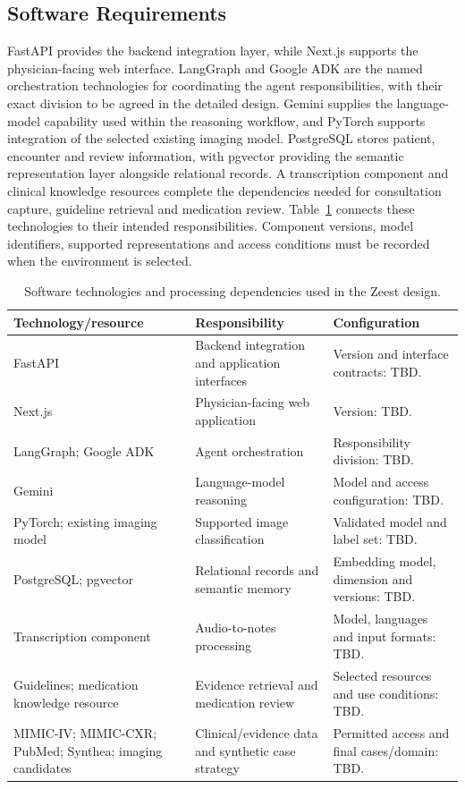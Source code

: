 \clearpage
\subsection{Software Requirements}
FastAPI provides the backend integration layer, while Next.js supports the physician-facing web interface. LangGraph and Google ADK are the named orchestration technologies for coordinating the agent responsibilities, with their exact division to be agreed in the detailed design. Gemini supplies the language-model capability used within the reasoning workflow, and PyTorch supports integration of the selected existing imaging model. PostgreSQL stores patient, encounter and review information, with pgvector providing the semantic representation layer alongside relational records. A transcription component and clinical knowledge resources complete the dependencies needed for consultation capture, guideline retrieval and medication review. Table~\ref{tab:kashaf:software} connects these technologies to their intended responsibilities. Component versions, model identifiers, supported representations and access conditions must be recorded when the environment is selected.

\begin{table}[htbp]
\centering
\small
\caption{Software technologies and processing dependencies used in the Zeest design.}
\label{tab:kashaf:software}
\begin{tabular}{|p{}|p{}|p{}|}
\hline
Technology/resource & Responsibility & Configuration \\ \hline
FastAPI & Backend integration and application interfaces & Version and interface contracts: TBD. \\ \hline
Next.js & Physician-facing web application & Version: TBD. \\ \hline
LangGraph; Google ADK & Agent orchestration & Responsibility division: TBD. \\ \hline
Gemini & Language-model reasoning & Model and access configuration: TBD. \\ \hline
PyTorch; existing imaging model & Supported image classification & Validated model and label set: TBD. \\ \hline
PostgreSQL; pgvector & Relational records and semantic memory & Embedding model, dimension and versions: TBD. \\ \hline
Transcription component & Audio-to-notes processing & Model, languages and input formats: TBD. \\ \hline
Guidelines; medication knowledge resource & Evidence retrieval and medication review & Selected resources and use conditions: TBD. \\ \hline
MIMIC-IV; MIMIC-CXR; PubMed; Synthea; imaging candidates & Clinical/evidence data and synthetic case strategy & Permitted access and final cases/domain: TBD. \\ \hline
\end{tabular}
\end{table}

